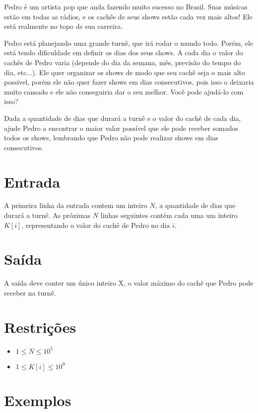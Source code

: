 Pedro é um artista pop que anda fazendo muito sucesso no Brasil. Suas músicas estão em todas as rádios, e os cachês de seus shows estão cada vez mais altos! Ele está realmente no topo de sua carreira.

Pedro está planejando uma grande turnê, que irá rodar o mundo todo. Porém, ele está tendo dificuldade em definir os dias dos seus shows. A cada dia o valor do cachês de Pedro varia (depende do dia da semana, mês, previsão do tempo do dia, etc...). Ele quer organizar os shows de modo que seu cachê seja o mais alto possível, porém ele não quer fazer shows em dias consecutivos, pois isso o deixaria muito cansado e ele não conseguiria dar o seu melhor.  Você pode ajudá-lo com isso?

Dada a quantidade de dias que durará a turnê e o valor do cachê de cada dia, ajude Pedro a encontrar o maior valor possível que ele pode receber somados todos os shows, lembrando que Pedro não pode realizar shows em dias consecutivos.

\section*{Entrada}

A primeira linha da entrada contem um inteiro $N$, a quantidade de dias que durará a turnê. As próximas $N$ linhas seguintes contém cada uma um inteiro $K[i]$, representando o valor do cachê de Pedro no dia $i$.

\section*{Saída}

A saída deve conter um único inteiro X, o valor máximo do cachê que Pedro pode receber na turnê.

\section*{Restrições}

\begin{itemize}
\item $1 \leq N \leq 10^5$
\item $1 \leq K[i] \leq 10^9$
\end{itemize}


\section*{Exemplos}

\exemplo
